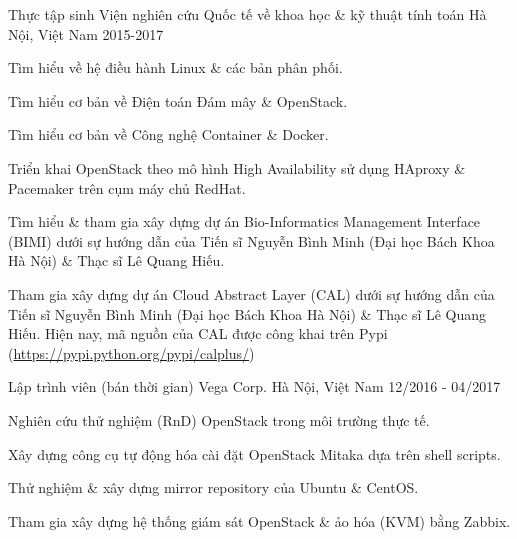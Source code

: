 

\begin{cventries}

  \cventry
    {Thực tập sinh} %
    {Viện nghiên cứu Quốc tế về khoa học \& kỹ thuật tính toán} %
    {Hà Nội, Việt Nam} %
    {2015-2017} %
    {
      \begin{cvitems} %
        \item {Tìm hiểu về hệ điều hành Linux \& các bản phân phối.}
        \item {Tìm hiểu cơ bản về Điện toán Đám mây \& OpenStack.}
        \item {Tìm hiểu cơ bản về Công nghệ Container \& Docker.}
        \item {Triển khai OpenStack theo mô hình High Availability sử dụng HAproxy \& Pacemaker trên cụm máy chủ RedHat.}
        \item {Tìm hiểu \& tham gia xây dựng dự án Bio-Informatics Management Interface (BIMI) dưới sự hướng dẫn của Tiến sĩ Nguyễn Bình Minh (Đại học Bách Khoa Hà Nội) \& Thạc sĩ Lê Quang Hiếu.}
        \item {Tham gia xây dựng dự án Cloud Abstract Layer (CAL) dưới sự hướng dẫn của Tiến sĩ Nguyễn Bình Minh (Đại học Bách Khoa Hà Nội) \& Thạc sĩ Lê Quang Hiếu. Hiện nay, mã nguồn của CAL được công khai trên Pypi (\url{https://pypi.python.org/pypi/calplus/})}
      \end{cvitems}
    }

  \cventry
    {Lập trình viên (bán thời gian)} %
    {Vega Corp.} %
    {Hà Nội, Việt Nam} %
    {12/2016 - 04/2017} %
    {
      \begin{cvitems} %
        \item {Nghiên cứu thử nghiệm (RnD) OpenStack trong môi trường thực tế.}
        \item {Xây dựng công cụ tự động hóa cài đặt OpenStack Mitaka dựa trên shell scripts.}
        \item {Thử nghiệm \& xây dựng mirror repository của Ubuntu \& CentOS.}
        \item {Tham gia xây dựng hệ thống giám sát OpenStack \& ảo hóa (KVM) bằng Zabbix.}
      \end{cvitems}
    }


\end{cventries}
